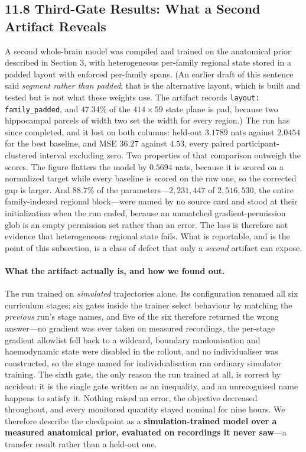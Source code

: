 \subsection{11.8 Third-Gate Results: What a Second Artifact Reveals}

A second whole-brain model was compiled and trained on the anatomical prior
described in Section 3, with heterogeneous per-family regional state stored in a
padded layout with enforced per-family spans. (An earlier draft of this sentence
said \emph{segment rather than padded}; that is the alternative layout, which is
built and tested but is not what these weights use. The artifact records
\texttt{layout: family\_padded}, and $47.34\%$ of the $414 \times 59$ state
plane is pad, because two hippocampal parcels of width two set the width for
every region.) The run has since completed, and it lost on both columns:
held-out \(3.1789\) nats against \(2.0454\) for the best baseline, and MSE
\(36.27\) against \(4.53\), every paired participant-clustered interval
excluding zero. Two properties of that comparison outweigh the scores. The
figure flatters the model by \(0.5694\) nats, because it is scored on a
normalized target while every baseline is scored on the raw one, so the
corrected gap is larger. And \(88.7\%\) of the parameters---\(2{,}231{,}447\) of
\(2{,}516{,}530\), the entire family-indexed regional block---were named by no
source card and stood at their initialization when the run ended, because an
unmatched gradient-permission glob is an empty permission set rather than an
error. The loss is therefore not evidence that heterogeneous regional state
fails. What is reportable, and is the point of this subsection, is a class of
defect that only a \emph{second} artifact can expose.

\paragraph{What the artifact actually is, and how we found out.}
The run trained on \emph{simulated} trajectories alone. Its configuration
renamed all six curriculum stages; six gates inside the trainer select
behaviour by matching the \emph{previous} run's stage names, and five of the six
therefore returned the wrong answer---no gradient was ever taken on measured
recordings, the per-stage gradient allowlist fell back to a wildcard,
boundary randomisation and haemodynamic state were disabled in the rollout, and
no individualiser was constructed, so the stage named for individualisation ran
ordinary simulator training. The sixth gate, the only reason the run trained at
all, is correct by accident: it is the single gate written as an inequality, and
an unrecognised name happens to satisfy it. Nothing raised an error, the
objective decreased throughout, and every monitored quantity stayed nominal for
nine hours. We therefore describe the checkpoint as a
\textbf{simulation-trained model over a measured anatomical prior, evaluated on
recordings it never saw}---a transfer result rather than a held-out one.

